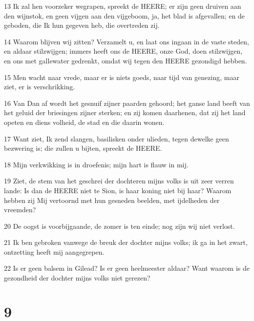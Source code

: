 \par 13 Ik zal hen voorzeker wegrapen, spreekt de HEERE; er zijn geen druiven aan den wijnstok, en geen vijgen aan den vijgeboom, ja, het blad is afgevallen; en de geboden, die Ik hun gegeven heb, die overtreden zij.
\par 14 Waarom blijven wij zitten? Verzamelt u, en laat ons ingaan in de vaste steden, en aldaar stilzwijgen; immers heeft ons de HEERE, onze God, doen stilzwijgen, en ons met gallewater gedrenkt, omdat wij tegen den HEERE gezondigd hebben.
\par 15 Men wacht naar vrede, maar er is niets goeds, naar tijd van genezing, maar ziet, er is verschrikking.
\par 16 Van Dan af wordt het gesnuif zijner paarden gehoord; het ganse land beeft van het geluid der briesingen zijner sterken; en zij komen daarhenen, dat zij het land opeten en diens volheid, de stad en die daarin wonen.
\par 17 Want ziet, Ik zend slangen, basilisken onder ulieden, tegen dewelke geen bezwering is; die zullen u bijten, spreekt de HEERE.
\par 18 Mijn verkwikking is in droefenis; mijn hart is flauw in mij.
\par 19 Ziet, de stem van het geschrei der dochteren mijns volks is uit zeer verren lande: Is dan de HEERE niet te Sion, is haar koning niet bij haar? Waarom hebben zij Mij vertoornd met hun gesneden beelden, met ijdelheden der vreemden?
\par 20 De oogst is voorbijgaande, de zomer is ten einde; nog zijn wij niet verlost.
\par 21 Ik ben gebroken vanwege de breuk der dochter mijns volks; ik ga in het zwart, ontzetting heeft mij aangegrepen.
\par 22 Is er geen balsem in Gilead? Is er geen heelmeester aldaar? Want waarom is de gezondheid der dochter mijns volks niet gerezen?

\chapter{9}

